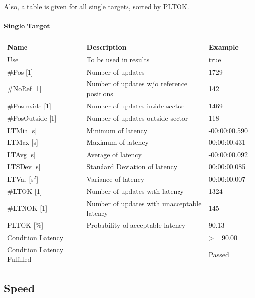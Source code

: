 Also, a table is given for all single targets, sorted by PLTOK.

\paragraph{Single Target}

\begin{center}
 \begin{table}[H]
  \begin{tabularx}{\textwidth}{ | l | X |  l | }
    \hline
    \textbf{Name} & \textbf{Description} & \textbf{Example} \\ \hline
    Use & To be used in results & true \\ \hline
    \#Pos [1] & Number of updates & 1729 \\ \hline
    \#NoRef [1] & Number of updates w/o reference positions & 142 \\ \hline
    \#PosInside [1] & Number of updates inside sector & 1469 \\ \hline
    \#PosOutside [1] & Number of updates outside sector & 118 \\ \hline
    LTMin [s] & Minimum of latency & -00:00:00.590 \\ \hline
    LTMax [s] & Maximum of latency & 00:00:00.431 \\ \hline
    LTAvg [s] & Average of latency & -00:00:00.092 \\ \hline
    LTSDev [s] & Standard Deviation of latency & 00:00:00.085 \\ \hline
    LTVar [s$^2$] & Variance of latency & 00:00:00.007 \\ \hline
    \#LTOK [1] & Number of updates with latency & 1324 \\ \hline
    \#LTNOK [1] & Number of updates with unacceptable latency  & 145 \\ \hline
    PLTOK [\%] & Probability of acceptable latency & 90.13 \\ \hline
    Condition Latency &  & >= 90.00 \\ \hline
    Condition Latency Fulfilled &  & Passed \\ \hline
\end{tabularx}
\end{table}
\end{center}

\subsection{Speed}
\label{sec:eval_req_speed} 

